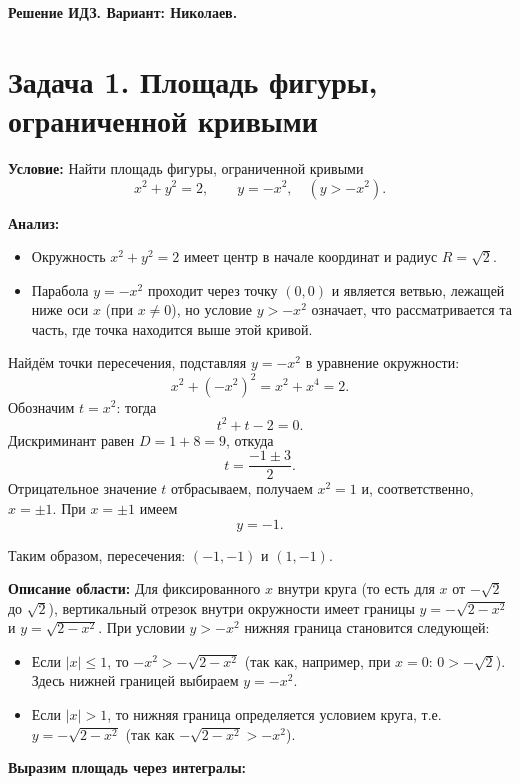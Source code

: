 \documentclass[12pt,a4paper]{article}
\begin{document}
\begin{center}
  \Large \textbf{Решение ИДЗ. Вариант: Николаев.}
\end{center}

\vspace{5mm}

\section*{Задача 1. Площадь фигуры, ограниченной кривыми}
\textbf{Условие:} Найти площадь фигуры, ограниченной кривыми
\[
x^2+y^2=2,\qquad y=-x^2,\quad (y > -x^2).
\]

\textbf{Анализ:} 
\begin{itemize}
  \item Окружность \(x^2+y^2=2\) имеет центр в начале координат и радиус \(R=\sqrt{2}\).
  \item Парабола \(y=-x^2\) проходит через точку \((0,0)\) и является ветвью, лежащей ниже оси \(x\) (при \(x\ne0\)), но условие \(y > -x^2\) означает, что рассматривается та часть, где точка находится выше этой кривой.
\end{itemize}

Найдём точки пересечения, подставляя \(y=-x^2\) в уравнение окружности:
\[
x^2+(-x^2)^2=x^2+x^4=2.
\]
Обозначим \(t=x^2\): тогда
\[
t^2+t-2=0.
\]
Дискриминант равен \(D=1+8=9\), откуда
\[
t=\frac{-1\pm3}{2}.
\]
Отрицательное значение \(t\) отбрасываем, получаем \(x^2=1\) и, соответственно, \(x=\pm1\). При \(x=\pm1\) имеем
\[
y=-1.
\]

Таким образом, пересечения: \((-1,-1)\) и \((1,-1)\).

\textbf{Описание области:}  
Для фиксированного \(x\) внутри круга (то есть для \(x\) от \(-\sqrt{2}\) до \(\sqrt{2}\)), вертикальный отрезок внутри окружности имеет границы \(y=-\sqrt{2-x^2}\) и \(y=\sqrt{2-x^2}\).  
При условии \(y> -x^2\) нижняя граница становится следующей:
\begin{itemize}
  \item Если \(|x|\le1\), то \(-x^2 > -\sqrt{2-x^2}\) (так как, например, при \(x=0\): \(0 > -\sqrt{2}\)). Здесь нижней границей выбираем \(y=-x^2\).
  \item Если \(|x|>1\), то нижняя граница определяется условием круга, т.е. \(y=-\sqrt{2-x^2}\) (так как \(-\sqrt{2-x^2}>-x^2\)).
\end{itemize}

\textbf{Выразим площадь через интегралы:}
\end{document}
